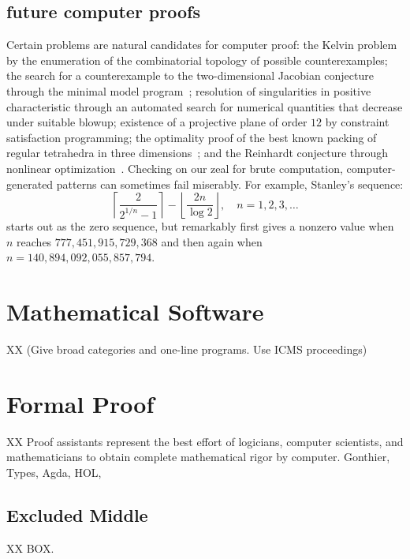 \documentclass{llncs}
\begin{document}
\subsection{future computer proofs}

Certain problems are natural candidates for computer proof: the Kelvin
problem by the enumeration of the combinatorial topology of possible
counterexamples; the search for a counterexample to the
two-dimensional Jacobian conjecture through the minimal model
program~\cite{Borisov}; resolution of singularities in positive
characteristic through an automated search for numerical quantities
that decrease under suitable blowup; existence of a projective plane
of order $12$ by constraint satisfaction programming; the optimality
proof of the best known packing of regular tetrahedra in three
dimensions~\cite{Chen-2010}; and the Reinhardt conjecture through
nonlinear optimization~\cite{HR11}.  Checking on our zeal for brute
computation, computer-generated patterns can sometimes fail miserably.
For example, Stanley's sequence:
\[
\left\lceil{\frac{2}{2^{1/n} - 1}}\right\rceil- \left\lfloor{\frac{2 n}{\log 2}}\right\rfloor,\quad n=1,2,3,\ldots
\]
starts out as the zero sequence, but remarkably first gives a nonzero
value when $n$ reaches $777,451,915,729,368$ and then again
when $n=140,894,092,055,857,794$.



\section{Mathematical Software}

XX (Give broad categories and one-line programs. Use ICMS proceedings)


\section{Formal Proof}

XX Proof assistants represent the best effort of logicians, computer
scientists, and mathematicians to obtain complete mathematical rigor
by computer.  Gonthier, Types, Agda, HOL,


\subsection{Excluded Middle}

XX BOX.
\end{document}
